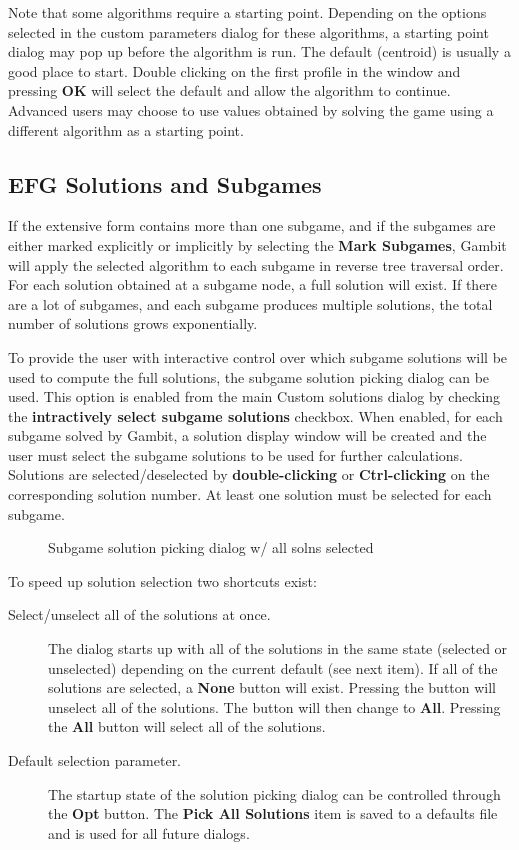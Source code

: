 \documentclass[12pt]{report}
\begin{document}
Note that some algorithms require a starting point.  Depending on the
options selected in the custom parameters dialog for these algorithms,
a starting point dialog may pop up before the algorithm is run.  The
default (centroid) is usually a good place to start.  Double clicking
on the first profile in the window and pressing {\bf OK} will select
the default and allow the algorithm to continue.  Advanced users may
choose to use values obtained by solving the game using a different
algorithm as a starting point.

\subsection{EFG Solutions and Subgames}\label{EFGSolnSubg}
If the extensive form contains more than one subgame, and if the
subgames are either marked explicitly or implicitly by selecting the 
{\bf Mark Subgames}, Gambit will apply the selected algorithm to each
subgame in reverse tree traversal order.  For each solution obtained
at a subgame node, a full solution will exist.  If there are a lot of
subgames, and each subgame produces multiple solutions, the total
number of solutions grows exponentially.

To provide the user with interactive control over which subgame
solutions will be used to compute the full solutions, the subgame
solution picking dialog can be used.  This option is enabled from the
main Custom solutions dialog by checking the {\bf intractively select
subgame solutions} checkbox.  When enabled, for each subgame solved by
Gambit, a solution display window will be created and the user must
select the subgame solutions to be used for further calculations.
Solutions are selected/deselected by {\bf double-clicking} or {\bf 
Ctrl-clicking} on the corresponding solution number.  At least one
solution must be selected for each subgame.

\begin{figure}
\caption{Subgame solution picking dialog w/ all solns selected}\label{fig_efgpick}
\end{figure}

To speed up solution selection two shortcuts exist:

\begin{description}
\item[Select/unselect all of the solutions at once.]  The dialog
starts up with all of the solutions in the same state (selected or
unselected) depending on the current default (see next item).  If all
of the solutions are selected, a {\bf None} button will exist.
Pressing the button will unselect all of the solutions.  The button
will then change to {\bf All}.  Pressing the {\bf All} button will
select all of the solutions.
\item[Default selection parameter.]  The startup state of the solution
picking dialog can be controlled through the {\bf Opt} button.  The
{\bf Pick All Solutions} item is saved to a defaults file and is used
for all future dialogs.
\end{description}
\end{document}
